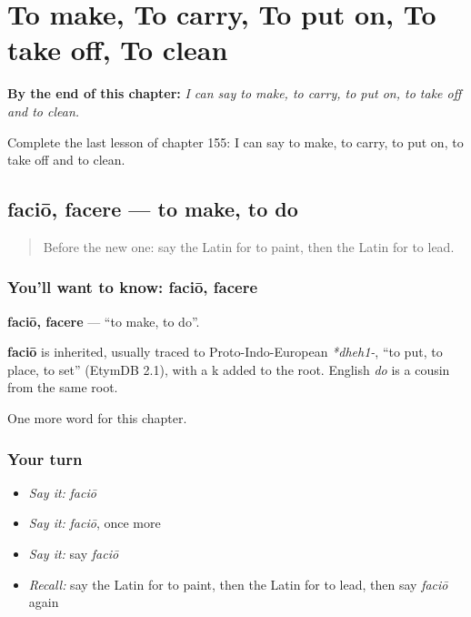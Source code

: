 
\chapter{To make, To carry, To put on, To take off, To clean}
\label{ch:la-to-make-to-carry-to-put-on-to-take-off-to-clean}

\begin{chapteropening}
\textbf{By the end of this chapter:} \emph{I can say to make, to carry, to put on, to take off and to clean.}

Complete the last lesson of chapter 155: I can say to make, to carry, to put on, to take off and to clean.
\end{chapteropening}

\section[faciō, facere]{faciō, facere — to make, to do}

\label{lesson:LA-C155-facio}



\begin{quote}
Before the new one: say the Latin for to paint, then the Latin for to lead.
\end{quote}

\subsection*{You'll want to know: faciō, facere}
\textbf{faciō, facere} — \textquotedblleft{}to make, to do\textquotedblright{}.

\begin{cousinweb}
\textbf{faciō} is inherited, usually traced to Proto-Indo-European \emph{*dheh1-}, \textquotedblleft{}to put, to place, to set\textquotedblright{} (EtymDB 2.1), with a k added to the root. English \emph{do} is a cousin from the same root.
\end{cousinweb}

\begin{grammarlens}[title={What you've built}]
One more word for this chapter.
\end{grammarlens}

\subsection*{Your turn}
\begin{itemize}
\raggedright
  \item \emph{Say it:} \emph{faciō}
  \item \emph{Say it:} \emph{faciō}, once more
  \item \emph{Say it:} say \emph{faciō}
  \item \emph{Recall:} say the Latin for to paint, then the Latin for to lead, then say \emph{faciō} again
\end{itemize}

